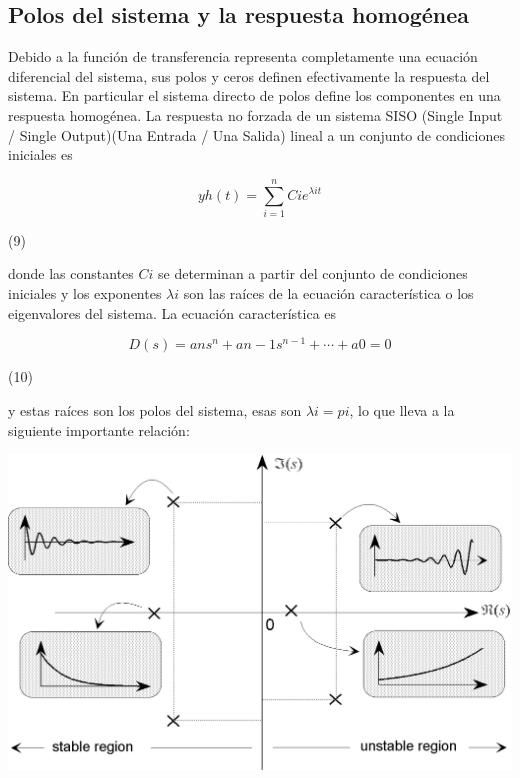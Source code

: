\documentclass[10pt,a4paper]{article}
\begin{document}
\subsection{Polos del sistema y la respuesta homogénea }
Debido a la función de transferencia representa completamente una ecuación diferencial del sistema, sus polos y ceros definen efectivamente la respuesta del sistema. En particular el sistema directo de polos define los componentes en una respuesta homogénea. La respuesta no forzada de un sistema SISO (Single Input / Single Output)(Una Entrada / Una Salida) lineal a un conjunto de condiciones iniciales es
\begin{center}
  \begin{center}
    \[y{\scriptscriptstyle h}(t)=\sum_{i=1}^n C{\scriptscriptstyle i}e^{\lambda{\scriptscriptstyle i}t}\]
  \end{center}
  \begin{minipage}{0.9\textwidth}
    \begin{flushright}
        (9)
    \end{flushright}
  \end{minipage}
\end{center}
donde las constantes $C{\scriptscriptstyle i}$ se determinan a partir del conjunto de condiciones iniciales y los exponentes $\lambda{\scriptscriptstyle i}$ son las raíces de la ecuación característica o los eigenvalores del sistema. La ecuación característica es
\begin{center}
  \begin{center}
    \[D(s)= a{\scriptscriptstyle n}s^{n}+a{\scriptscriptstyle n-1}s^{n-1}+\cdots+a{\scriptscriptstyle 0}=0\]
  \end{center}
  \begin{minipage}{0.9\textwidth}
    \begin{flushright}
        (10)
    \end{flushright}
  \end{minipage}
\end{center}
y estas raíces son los polos del sistema, esas son $\lambda{\scriptscriptstyle i}=p{\scriptscriptstyle i}$, lo que lleva a la siguiente importante relación:
\clearpage
\begin{center}
  \includegraphics[scale=0.2]{img/grafica1.png}
\end{center}
\end{document}
